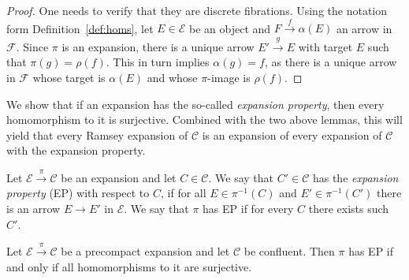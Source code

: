 \documentclass[preprint,12pt]{elsarticle}
\newcommand{\cat}[1]{\mathcal{#1}}
\begin{document}
\begin{proof}
    One needs to verify that they are discrete fibrations. Using the notation form Definition~\ref{def:homs}, let $E\in\cat E$ be an object and $F\xrightarrow{f}\alpha(E)$ an arrow in $\cat F$. Since $\pi$ is an expansion, there is a unique arrow $E'\xrightarrow{g}E$ with target $E$ such that $\pi(g)=\rho(f)$. This in turn implies $\alpha (g) =f$, as there is a unique arrow in $\cat F$ whose target is $\alpha( E)$ and whose $\pi$-image is $\rho(f)$.
\end{proof}


We show that if an expansion has the so-called \emph{expansion property}, then every homomorphism to it is surjective. Combined with the two above lemmas, this will yield that every Ramsey expansion of $\cat C$ is an expansion of every expansion of $\cat C$ with the expansion property.


\begin{defin}
\label{def:ep}
Let $\cat E\xrightarrow{\pi}\cat C$ be an expansion and let $C\in\cat C$. We say that $C'\in\cat C$ has the \emph{expansion property} (EP) with respect to $C$, if for all $E\in\pi^{-1}(C)$ and $E'\in\pi^{-1}(C')$ there is an arrow $E\xrightarrow{}E'$ in $\cat E$. We say that $\pi$ has EP if for every $C$ there exists such $C'$.
\end{defin}

\begin{prop}
\label{prop:ep}
Let $\cat E\xrightarrow{\pi}\cat C$ be a precompact expansion and let $\cat C$ be confluent. Then $\pi$ has EP if and only if all homomorphisms to it are surjective.
\end{prop}        
\end{document}
